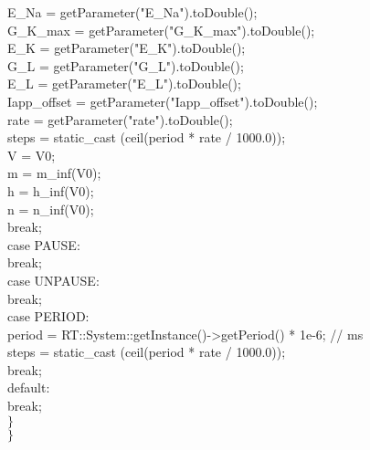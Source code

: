 \begin{maxipage}
\begin{example}
\hspace{1.5cm}E\_Na = getParameter("E\_Na").toDouble();\\
\hspace{1.5cm}G\_K\_max = getParameter("G\_K\_max").toDouble();\\
\hspace{1.5cm}E\_K = getParameter("E\_K").toDouble();\\
\hspace{1.5cm}G\_L = getParameter("G\_L").toDouble();\\
\hspace{1.5cm}E\_L = getParameter("E\_L").toDouble();\\
\hspace{1.5cm}Iapp\_offset = getParameter("Iapp\_offset").toDouble();\\
\hspace{1.5cm}rate = getParameter("rate").toDouble();\\
\hspace{1.5cm}steps = static\_cast (ceil(period * rate / 1000.0));\\
\hspace{1.5cm}V = V0;\\
\hspace{1.5cm}m = m\_inf(V0);\\
\hspace{1.5cm}h = h\_inf(V0);\\
\hspace{1.5cm}n = n\_inf(V0);\\
\hspace{1.5cm}break;\\
\hspace{1cm}case PAUSE:\\
\hspace{1.5cm}break;\\
\hspace{1cm}case UNPAUSE:\\
\hspace{1.5cm}break;\\
\hspace{1cm}case PERIOD:\\
\hspace{1.5cm}period = RT::System::getInstance()->getPeriod() * 1e-6; // ms\\
\hspace{1.5cm}steps = static\_cast (ceil(period * rate / 1000.0));\\
\hspace{1.5cm}break;\\
\hspace{1cm}default:\\
\hspace{1.5cm}break;\\
\hspace{.5cm}$\}$\\
$\}$
\end{example}
\end{maxipage}
